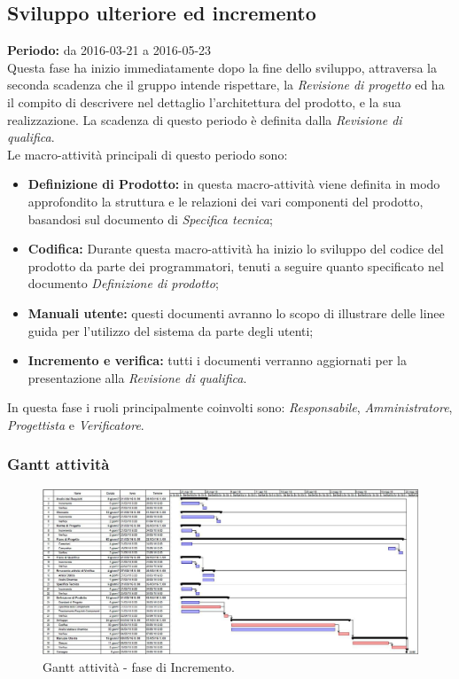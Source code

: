 \documentclass[a4paper]{article}
\begin{document}
		\subsection{Sviluppo ulteriore ed incremento}
			\textbf{Periodo:} da 2016-03-21 a 2016-05-23 \\
			
			Questa fase ha inizio immediatamente dopo la fine dello sviluppo, attraversa la seconda 
			scadenza che il gruppo intende rispettare, la \emph{Revisione di progetto} ed ha il compito di descrivere nel dettaglio 
			l'architettura del prodotto, e la sua realizzazione. La scadenza di questo periodo è definita dalla 
			\emph{Revisione di qualifica}. \\
			Le macro-attività principali di questo periodo sono:
			\begin{itemize}
				\item \textbf{Definizione di Prodotto:} in questa macro-attività viene definita in modo approfondito la struttura e le relazioni 
				dei vari componenti del prodotto, basandosi sul documento di \emph{Specifica tecnica}; 
				\item \textbf{Codifica:} Durante questa macro-attività ha inizio lo sviluppo del codice del prodotto da parte dei programmatori, 
				tenuti a seguire quanto specificato nel documento \emph{Definizione di prodotto};
				\item \textbf{Manuali utente:} questi documenti avranno lo scopo di illustrare delle linee guida per l'utilizzo 
				del sistema da parte degli utenti;
				\item \textbf{Incremento e verifica:} tutti i documenti verranno aggiornati per la presentazione alla 
				\emph{Revisione di qualifica}.
			\end{itemize}
			In questa fase i ruoli principalmente coinvolti sono: \emph{Responsabile}, \emph{Amministratore},
			\emph{Progettista} e \emph{Verificatore}.

			\subsubsection{Gantt attività}
				\begin{figure}[H]
					\centering
					\includegraphics[scale=0.4]{gantt_incremento}
					\caption{Gantt attività - fase di Incremento.}
				\end{figure}
\end{document}

